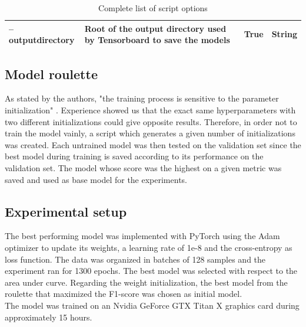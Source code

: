 \begin{table}[]
{\begin{tabular}{|llll|}
\textbf{--outputdirectory}  & Root of the output directory used by Tensorboard to save the models                                                                                                                                                 & True                                                                        & String        \\ \hline
\end{tabular}%
}
\caption{Complete list of script options}
\label{fig:paper_reproduction_options}
\end{table}


\subsection{Model roulette}
As stated by the authors, "the training process is sensitive to the parameter initialization" \cite{07}. Experience showed us that the exact same hyperparameters with two different initializations could give opposite results. Therefore, in order not to train the model vainly, a script which generates a given number of initializations was created. Each untrained model was then tested on the validation set since the best model during training is saved according to its performance on the validation set. The model whose score was the highest on a given metric was saved and used as base model for the experiments. 


\subsection{Experimental setup}
The best performing model was implemented with PyTorch using the Adam optimizer to update its weights, a learning rate of 1e-8 and the cross-entropy as loss function. The data was organized in batches of 128 samples and the experiment ran for 1300 epochs. The best model was selected with respect to the area under curve. Regarding the weight initialization, the best model from the roulette that maximized the F1-score was chosen as initial model.\\
The model was trained on an Nvidia GeForce GTX Titan X graphics card during approximately 15 hours.

